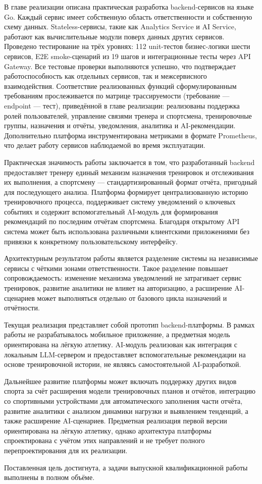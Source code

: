 В главе реализации описана практическая разработка backend-сервисов на языке Go. Каждый сервис имеет собственную область ответственности и собственную схему данных. Stateless-сервисы, такие как Analytics Service и AI Service, работают как вычислительные модули поверх данных других сервисов. Проведено тестирование на трёх уровнях: 112 unit-тестов бизнес-логики шести сервисов, E2E smoke-сценарий из 19 шагов и интеграционные тесты через API Gateway. Все тестовые проверки выполняются успешно, что подтверждает работоспособность как отдельных сервисов, так и межсервисного взаимодействия. Соответствие реализованных функций сформулированным требованиям прослеживается по матрице трассируемости (требование --- endpoint --- тест), приведённой в главе реализации: реализованы поддержка ролей пользователей, управление связями тренера и спортсмена, тренировочные группы, назначения и отчёты, уведомления, аналитика и AI-рекомендации. Дополнительно платформа инструментирована метриками в формате Prometheus, что делает работу сервисов наблюдаемой во время эксплуатации.

Практическая значимость работы заключается в том, что разработанный backend предоставляет тренеру единый механизм назначения тренировок и отслеживания их выполнения, а спортсмену --- стандартизированный формат отчёта, пригодный для последующего анализа. Платформа формирует централизованную историю тренировочного процесса, поддерживает систему уведомлений о ключевых событиях и содержит вспомогательный AI-модуль для формирования рекомендаций по последним отчётам спортсмена. Благодаря открытому API система может быть использована различными клиентскими приложениями без привязки к конкретному пользовательскому интерфейсу.

Архитектурным результатом работы является разделение системы на независимые сервисы с чёткими зонами ответственности. Такое разделение повышает сопровождаемость: изменение механизма уведомлений не затрагивает сервис тренировок, развитие аналитики не влияет на авторизацию, а расширение AI-сценариев может выполняться отдельно от базового цикла назначений и отчётности.

Текущая реализация представляет собой прототип backend-платформы. В рамках работы не разрабатывалось мобильное приложение, а предметная модель ориентирована на лёгкую атлетику. AI-модуль реализован как интеграция с локальным LLM-сервером и предоставляет вспомогательные рекомендации на основе тренировочной истории, не являясь самостоятельной AI-разработкой.

Дальнейшее развитие платформы может включать поддержку других видов спорта за счёт расширения модели тренировочных планов и отчётов, интеграцию со спортивными устройствами для автоматического заполнения части отчёта, развитие аналитики с анализом динамики нагрузки и выявлением тенденций, а также расширение AI-сценариев. Предметная реализация первой версии ориентирована на лёгкую атлетику, однако архитектура платформы спроектирована с учётом этих направлений и не требует полного перепроектирования для их реализации.

Поставленная цель достигнута, а задачи выпускной квалификационной работы выполнены в полном объёме.
